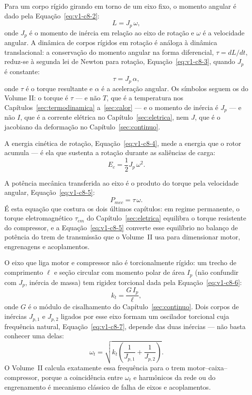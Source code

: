 \documentclass[12pt,a4paper]{article}
\numberwithin{equation}{section}
\numberwithin{table}{section}
\numberwithin{figure}{section}
\begin{document}
Para um corpo rígido girando em torno de um eixo fixo, o momento angular é
dado pela Equação~\eqref{eq:v1-c8-2}:
\begin{equation}\label{eq:v1-c8-2}
L = J_p\,\omega,
\end{equation}
onde $J_p$ é o momento de inércia em relação ao eixo de rotação e $\omega$ é
a velocidade angular. A dinâmica de corpos rígidos em rotação é análoga à
dinâmica translacional: a conservação do momento angular na forma
diferencial, $\tau = dL/dt$, reduz-se à segunda lei de Newton para rotação,
Equação~\eqref{eq:v1-c8-3}, quando $J_p$ é constante:
\begin{equation}\label{eq:v1-c8-3}
\tau = J_p \, \alpha,
\end{equation}
onde $\tau$ é o torque resultante e $\alpha$ é a aceleração angular. Os
símbolos seguem os do Volume II: o torque é $\tau$ --- e não $T$, que é a
temperatura nos Capítulos~\ref{sec:termodinamica} a~\ref{sec:calor} --- e o
momento de inércia é $J_p$ --- e não $I$, que é a corrente elétrica no
Capítulo~\ref{sec:eletrica}, nem $J$, que é o jacobiano da deformação no
Capítulo~\ref{sec:continuo}.

A energia cinética de rotação, Equação~\eqref{eq:v1-c8-4}, mede a energia que
o rotor acumula --- é ela que sustenta a rotação durante as saliências de
carga:
\begin{equation}\label{eq:v1-c8-4}
E_c = \frac{1}{2} J_p \,\omega^2.
\end{equation}

A potência mecânica transferida ao eixo é o produto do torque pela velocidade
angular, Equação~\eqref{eq:v1-c8-5}:
\begin{equation}\label{eq:v1-c8-5}
P_{mec} = \tau\,\omega.
\end{equation}
É esta equação que costura os dois últimos capítulos: em regime permanente, o
torque eletromagnético $\tau_{em}$ do Capítulo~\ref{sec:eletrica} equilibra o
torque resistente do compressor, e a Equação~\eqref{eq:v1-c8-5} converte esse
equilíbrio no balanço de potência do trem de transmissão que o Volume~II usa
para dimensionar motor, engrenagens e acoplamentos.

O eixo que liga motor e compressor não é torcionalmente rígido: um trecho de
comprimento $\ell$ e seção circular com momento polar de área $I_p$ (não
confundir com $J_p$, inércia de massa) tem rigidez torcional dada pela
Equação~\eqref{eq:v1-c8-6}:
\begin{equation}\label{eq:v1-c8-6}
k_t = \frac{G\,I_p}{\ell},
\end{equation}
onde $G$ é o módulo de cisalhamento do Capítulo~\ref{sec:continuo}. Dois
corpos de inércias $J_{p,1}$ e $J_{p,2}$ ligados por esse eixo formam um
oscilador torcional cuja frequência natural, Equação~\eqref{eq:v1-c8-7},
depende das duas inércias --- não basta conhecer uma delas:
\begin{equation}\label{eq:v1-c8-7}
\omega_{t} = \sqrt{k_t\left(\frac{1}{J_{p,1}} + \frac{1}{J_{p,2}}\right)}.
\end{equation}
O Volume~II calcula exatamente essa frequência para o trem
motor--caixa--compressor, porque a coincidência entre $\omega_t$ e harmônicos
da rede ou do engrenamento é mecanismo clássico de falha de eixos e
acoplamentos.
\end{document}

